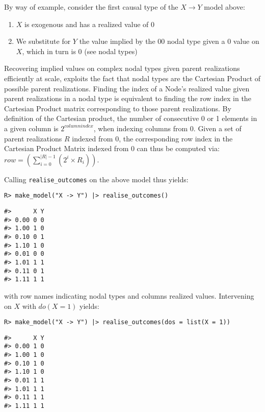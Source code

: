\documentclass[
  11pt,
  article]{jss}
\providecommand{\tightlist}{%
  \setlength{\itemsep}{0pt}\setlength{\parskip}{0pt}}\usepackage{longtable,booktabs,array}
\begin{document}
By way of example, consider the first causal type of the
\(X \rightarrow Y\) model above:

\begin{enumerate}
\def\labelenumi{\arabic{enumi}.}
\tightlist
\item
  \(X\) is exogenous and has a realized value of \(0\)
\item
  We substitute for \(Y\) the value implied by the \(00\) nodal type
  given a \(0\) value on \(X\), which in turn is \(0\) (see nodal types)
\end{enumerate}

Recovering implied values on complex nodal types given parent
realizations efficiently at scale, exploits the fact that nodal types
are the Cartesian Product of possible parent realizations. Finding the
index of a Node's realized value given parent realizations in a nodal
type is equivalent to finding the row index in the Cartesian Product
matrix corresponding to those parent realizations. By definition of the
Cartesian product, the number of consecutive 0 or 1 elements in a given
column is \(2^{columnindex}\), when indexing columns from 0. Given a set
of parent realizations \(R\) indexed from 0, the corresponding row index
in the Cartesian Product Matrix indexed from 0 can thus be computed via:
\(row = (\sum_{i = 0}^{|R| - 1} (2^{i} \times R_i))\).

Calling \texttt{realise\_outcomes} on the above model thus yields:

\begin{verbatim}
R> make_model("X -> Y") |> realise_outcomes()
\end{verbatim}

\begin{verbatim}
#>      X Y
#> 0.00 0 0
#> 1.00 1 0
#> 0.10 0 1
#> 1.10 1 0
#> 0.01 0 0
#> 1.01 1 1
#> 0.11 0 1
#> 1.11 1 1
\end{verbatim}

with row names indicating nodal types and columns realized values.
Intervening on \(X\) with \(do(X=1)\) yields:

\begin{verbatim}
R> make_model("X -> Y") |> realise_outcomes(dos = list(X = 1))
\end{verbatim}

\begin{verbatim}
#>      X Y
#> 0.00 1 0
#> 1.00 1 0
#> 0.10 1 0
#> 1.10 1 0
#> 0.01 1 1
#> 1.01 1 1
#> 0.11 1 1
#> 1.11 1 1
\end{verbatim}
\end{document}
